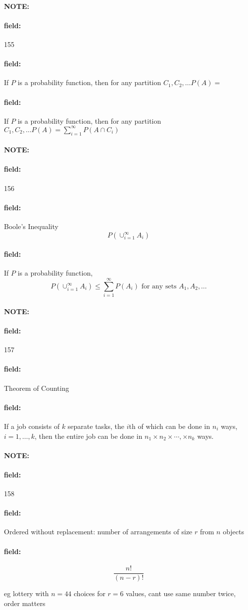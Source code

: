 \documentclass[12pt]{article}
\newenvironment{note}{\paragraph{NOTE:}}{}
\newenvironment{field}{\paragraph{field:}}{}
\begin{document}
\begin{note} \begin{field} \tiny 155 \end{field}
    \begin{field}If $P$ is a probability function, then for any partition $C_1, C_2, \ldots P(A) = $
    \end{field}
    \begin{field}If $P$ is a probability function, then for any partition $C_1, C_2, \ldots P(A) = \sum_{i=1}^\infty P(A \cap C_i)$
    \end{field}
\end{note}

\begin{note} \begin{field} \tiny 156 \end{field}
    \begin{field}
        Boole's Inequality
        $$P(\cup_{i=1}^\infty A_i)$$
    \end{field}
    \begin{field}
        If $P$ is a probability function,
            $$P(\cup_{i=1}^\infty A_i) \leq \sum_{i=1}^\infty P(A_i) \text{ for any sets } A_1, A_2, \ldots $$
    \end{field}
\end{note}

\begin{note} \begin{field} \tiny 157 \end{field}
    \begin{field}
         Theorem of Counting
    \end{field}
    \begin{field}
        If a job consists of $k$ separate tasks, the $i$th of which can be done in $n_i$ ways, $i = 1, \ldots, k$, then the entire job can be done in $n_1 \times n_2 \times \cdots, \times n_k$ ways.
    \end{field}
\end{note}

\begin{note} \begin{field} \tiny 158 \end{field}
    \begin{field}
        Ordered without replacement: number of arrangements of size $r$ from $n$ objects
    \end{field}
    \begin{field}
        $$\frac{n!}{(n-r)!}$$

        eg lottery with $n=44$ choices for $r=6$ values, cant use same number twice, order matters
    \end{field}
\end{note}
\end{document}
